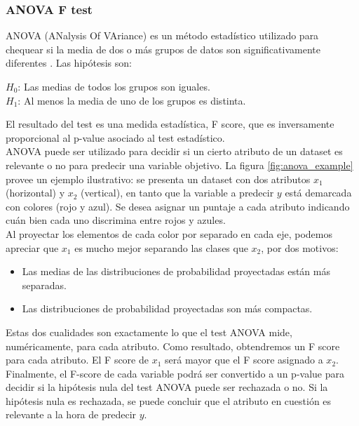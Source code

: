 \subsubsection{ANOVA F test}
\label{f_test}
ANOVA (ANalysis Of VAriance) es un método estadístico utilizado para chequear si la media de dos o más grupos de datos son significativamente diferentes \cite{191611} \cite{han2012mining}. Las hipótesis son:\\

\begin{adjustwidth}{2cm}{}
\textbf{$H_0$}: Las medias de todos los grupos son iguales. \\
\textbf{$H_1$}: Al menos la media de uno de los grupos es distinta. \\
\end{adjustwidth}

El resultado del test es una medida estadística, F score, que es inversamente proporcional al p-value asociado al test estadístico. \\

ANOVA puede ser utilizado para decidir si un cierto atributo de un dataset es relevante o no para predecir una variable objetivo. La figura \ref{fig:anova_example} provee un ejemplo ilustrativo: se presenta un dataset con dos atributos $x_1$ (horizontal) y $x_2$ (vertical),  en tanto que la variable a predecir $y$ está demarcada con colores (rojo y azul). Se desea asignar un puntaje a cada atributo indicando cuán bien cada uno discrimina entre rojos y azules. \\

Al proyectar los elementos de cada color por separado en cada eje, podemos apreciar que $x_1$ es mucho mejor separando las clases que $x_2$, por dos motivos:

\begin{itemize}
\item Las medias de las distribuciones de probabilidad proyectadas están más separadas.
\item Las distribuciones de probabilidad proyectadas son más compactas.
\end{itemize}

Estas dos cualidades son exactamente lo que el test ANOVA mide, numéricamente, para cada atributo. Como resultado, obtendremos un F score para cada atributo. El F score de $x_1$ será mayor que el F score asignado a $x_2$. Finalmente, el F-score de cada variable podrá ser convertido a un p-value para decidir si la hipótesis nula del test ANOVA puede ser rechazada o no. Si la hipótesis nula es rechazada, se puede concluir que el atributo en cuestión es relevante a la hora de predecir $y$. 

